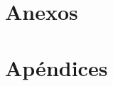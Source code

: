 \documentclass[letterpaper,10pt]{upiita}
\begin{document}
\part{Anexos}
\anexo

%
%
\part{Apéndices}
\appendix






\end{document}
